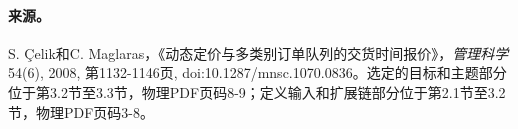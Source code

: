 \documentclass[11pt]{article}
\begin{document}
\paragraph{来源。}
S. \c{C}elik和C. Maglaras，《动态定价与多类别订单队列的交货时间报价》，\emph{管理科学} 54(6), 2008, 第1132-1146页, doi:10.1287/mnsc.1070.0836。选定的目标和主题部分位于第3.2节至3.3节，物理PDF页码8-9；定义输入和扩展链部分位于第2.1节至3.2节，物理PDF页码3-8。
\end{document}
